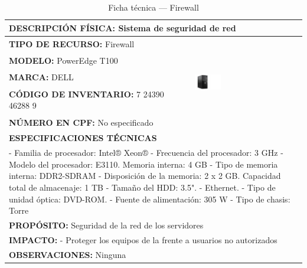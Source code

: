 \begin{table}[H]
\centering
\caption{Ficha técnica --- Firewall}\label{tab:firewall-1}
\begin{tabular}{|p{}|p{}|}\hline
\multicolumn{2}{|l|}{\textbf{DESCRIPCIÓN FÍSICA:} Sistema de seguridad de red} \\ \hline\textbf{TIPO DE RECURSO:} Firewall & 
\multirow{5}{*}{\includegraphics[width=0.25\textwidth,height=4cm,keepaspectratio]{tablas-images/cp1/firewall/firewall.png}} \\ \cline{1-1}
\textbf{MODELO:} PowerEdge T100 & \\ \cline{1-1}
\textbf{MARCA:} DELL & \\ \cline{1-1}
\textbf{CÓDIGO DE INVENTARIO:} 7 24390 46288 9 & \\ \cline{1-1}
\textbf{NÚMERO EN CPF:} No especificado & \\ \hline
\multicolumn{2}{|l|}{\textbf{ESPECIFICACIONES TÉCNICAS}} \\ \hline
\multicolumn{2}{|p{0.95\textwidth}|}{
\footnotesize
- Familia de procesador: Intel® Xeon®
- Frecuencia del procesador: 3 GHz
- Modelo del procesador: E3110. Memoria interna: 4 GB
- Tipo de memoria interna: DDR2-SDRAM
- Disposición de la memoria: 2 x 2 GB. Capacidad total de almacenaje: 1 TB
- Tamaño del HDD: 3.5". 
- Ethernet. 
- Tipo de unidad óptica: DVD-ROM. 
- Fuente de alimentación: 305 W 
- Tipo de chasis: Torre
} \\ \hline
\multicolumn{2}{|l|}{\textbf{PROPÓSITO:} Seguridad de la red de los servidores} \\ \hline
\multicolumn{2}{|l|}{\textbf{IMPACTO:} - Proteger los equipos de la frente a usuarios no autorizados} \\ \hline
\multicolumn{2}{|l|}{\textbf{OBSERVACIONES:} Ninguna} \\ \hline
\end{tabular}
\end{table}